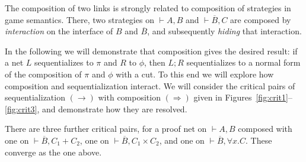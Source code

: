 \documentclass[UKenglish]{lipics-v2019}
\makeatletter
\newcommand\+{+}
\renewcommand\*{\times}
\newcommand\dual[1]{\overline{#1}}
\newcommand\seq[2]{{\vdash}#1,#2}
\newcommand\Seq{\vphantom(\seq}
\newcommand\Prf[3]{\deduce{\Seq{#2}{#3}}{\vphantom(#1}}
\newcommand\comp{\mathbin;}
\newcommand\minus{\mathop{\!/\mathchoice{\kern-3pt}{\kern-3pt}{\kern-2.5pt}{\kern-2pt}/\!}}
\newcommand\fix[2][2pt]{\overrightharpoon[#1]{#2}}
\newcommand\subdual[1]{_{\smash{\,\dual{\!#1}}}}
\newcommand\scoal{\rightarrow} %
\newcommand\qrr[1]{
  \ifx#1+\expandafter\@qrr\else
  \ifx#1*\*\mathrm R\else
  \ifx#1!\forall\mathrm R\else
  \ifx#1?\expandafter\@@qrr\else
  \ifx#11\mathrm{ax}\else
  \ifx#1.\mathrm{cut}\else
  #1\mathrm R
  \fi\fi\fi\fi\fi\fi
}
\newcommand\@qrr[1]{+\mathrm R,#1}
\newcommand\@@qrr[1]{\exists\mathrm R,#1}
\DeclareRobustCommand{\overrightharpoon}{\mathpalette{\overarrow@\rightharpoonfill@}}
\def\rightharpoonfill@{\arrowfill@\mn@relbar\mn@relbar\rightharpoonup}
\renewcommand\overrightharpoon[2][2pt]{
\begin{tikzpicture}[baseline=0]
	\node[inner sep=0pt,outer sep=0pt,anchor=base] (x) at (0,0) {$#2$};
	\draw[-left to] ($(x.north west) + (0pt,#1)$) -- ($(x.north east) + (0pt,#1)$);
\end{tikzpicture}}
\makeatother
\begin{document}
The composition of two links is strongly related to composition of strategies in game semantics. There, two strategies on $\seq AB$ and $\seq{\dual B}C$ are composed by \emph{interaction} on the interface of $B$ and $\dual B$, and subsequently \emph{hiding} that interaction. 

In the following we will demonstrate that composition gives the desired result: if a net $L$ sequentializes to $\pi$ and $R$ to $\phi$, then $L\comp R$ sequentializes to a normal form of the composition of $\pi$ and $\phi$ with a cut. To this end we will explore how composition and sequentialization interact. We will consider the critical pairs of sequentialization $(\scoal)$ with composition $(\Rightarrow)$ given in Figures~\ref{fig:crit1}--\ref{fig:crit3}, and demonstrate how they are resolved.



There are three further critical pairs, for a proof net on $\seq AB$ composed with one on $\seq {\dual B}{C_1{\+}C_2}$, one on $\seq {\dual B}{C_1{\*}C_2}$, and one on $\seq {\dual B}{\forall x.C}$. These converge as the one above.
\end{document}
